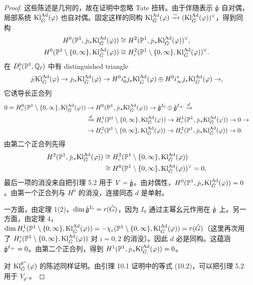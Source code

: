 \begin{proof}
这些陈述是几何的，故在证明中忽略 Tate 扭转。由于伴随表示 $\check{\mathfrak g}$ 自对偶，局部系统 $\mathrm{Kl}^{\mathrm{Ad}}_{\check G}(\varphi)$ 也自对偶。固定这样的同构 $\mathrm{Kl}^{\mathrm{Ad}}_{\check G}(\varphi)\xrightarrow{\sim}(\mathrm{Kl}^{\mathrm{Ad}}_{\check G}(\varphi))^\vee$，得到同构
\begin{equation}
\begin{aligned}
H^0(\mathbb{P}^1,j_{!*}\mathrm{Kl}^{\mathrm{Ad}}_{\check G}(\varphi))&\cong H^2(\mathbb{P}^1,j_{!*}\mathrm{Kl}^{\mathrm{Ad}}_{\check G}(\varphi))^\vee,\\
H^0(\mathbb{P}^1\setminus\{0,\infty\},\mathrm{Kl}^{\mathrm{Ad}}_{\check G}(\varphi))&\cong H^2_c(\mathbb{P}^1\setminus\{0,\infty\},\mathrm{Kl}^{\mathrm{Ad}}_{\check G}(\varphi))^\vee.
\end{aligned}
\end{equation}
在 $D^b_c(\mathbb{P}^1,\mathbb{Q}_\ell)$ 中有 distinguished triangle
\begin{equation}
j_!\mathrm{Kl}^{\mathrm{Ad}}_{\check G}(\varphi)\to j_{!*}\mathrm{Kl}^{\mathrm{Ad}}_{\check G}(\varphi)\to H^0i_0^*j_*\mathrm{Kl}^{\mathrm{Ad}}_{\check G}(\varphi)\oplus H^0i_\infty^*j_*\mathrm{Kl}^{\mathrm{Ad}}_{\check G}(\varphi)\to,
\end{equation}
它诱导长正合列
\begin{equation}
\begin{aligned}
0=H^0_c(\mathbb{P}^1\setminus\{0,\infty\},\mathrm{Kl}^{\mathrm{Ad}}_{\check G}(\varphi))&\to H^0(\mathbb{P}^1,j_{!*}\mathrm{Kl}^{\mathrm{Ad}}_{\check G}(\varphi))\to\check{\mathfrak g}^{I_0}\oplus\check{\mathfrak g}^{I_\infty}\xrightarrow{d}\\
&\xrightarrow{d}H^1_c(\mathbb{P}^1\setminus\{0,\infty\},\mathrm{Kl}^{\mathrm{Ad}}_{\check G}(\varphi))\to H^1_c(\mathbb{P}^1,j_{!*}\mathrm{Kl}^{\mathrm{Ad}}_{\check G}(\varphi))\to 0\to\\
&\to H^2_c(\mathbb{P}^1\setminus\{0,\infty\},\mathrm{Kl}^{\mathrm{Ad}}_{\check G}(\varphi))\to H^2_c(\mathbb{P}^1,j_{!*}\mathrm{Kl}^{\mathrm{Ad}}_{\check G}(\varphi))\to 0.
\end{aligned}
\end{equation}
由第二个正合列先得
\[
\begin{aligned}
H^2(\mathbb{P}^1,j_{!*}\mathrm{Kl}^{\mathrm{Ad}}_{\check G}(\varphi))&\cong H^2_c(\mathbb{P}^1\setminus\{0,\infty\},\mathrm{Kl}^{\mathrm{Ad}}_{\check G}(\varphi))\\
&\cong H^0(\mathbb{P}^1\setminus\{0,\infty\},\mathrm{Kl}^{\mathrm{Ad}}_{\check G}(\varphi))^\vee=0,
\end{aligned}
\]
最后一项的消没来自把引理 5.2 用于 $V=\check{\mathfrak g}$。由对偶性，$H^0(\mathbb{P}^1,j_{!*}\mathrm{Kl}^{\mathrm{Ad}}_{\check G}(\varphi))=0$。由第一个正合列与 $H^0$ 的消没，连接同态 $d$ 是单射。

一方面，由定理 1(2)，$\dim\check{\mathfrak g}^{I_0}=r(\check G)$，因为 $I_0$ 通过主幂幺元作用在 $\check{\mathfrak g}$ 上。另一方面，由定理 4，$\dim H^1_c(\mathbb{P}^1\setminus\{0,\infty\},\mathrm{Kl}^{\mathrm{Ad}}_{\check G}(\varphi))=-\chi_c(\mathbb{P}^1\setminus\{0,\infty\},\mathrm{Kl}^{\mathrm{Ad}}_{\check G}(\varphi))=r(\check G)$（这里再次用了 $H^i_c(\mathbb{P}^1\setminus\{0,\infty\},\mathrm{Kl}^{\mathrm{Ad}}_{\check G}(\varphi))$ 对 $i=0,2$ 的消没）。因此 $d$ 必是同构。这蕴涵 $\check{\mathfrak g}^{I_\infty}=0$。由第二个正合列，得到 $H^1(\mathbb{P}^1,j_{!*}\mathrm{Kl}^{\mathrm{Ad}}_{\check G}(\varphi))=0$。

对 $\mathrm{Kl}^{\theta^\vee}_{\check G}(\varphi)$ 的陈述同样证明。由引理 10.1 证明中的等式 (10.2)，可以把引理 5.2 用于 $V_{\theta^\vee}$。
\end{proof}

